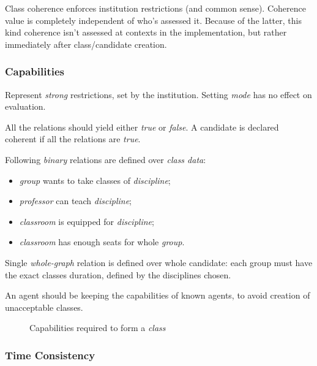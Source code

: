 \documentclass[../header]{subfiles}
\begin{document}
\providecommand{\rootdir}{..}



Class coherence enforces institution restrictions (and common sense).
Coherence value is completely independent of who's assessed it.
Because of the latter, this kind coherence isn't assessed at contexts
in the implementation, but rather immediately after class/candidate creation.

\subsubsection{Capabilities}

Represent \emph{strong} restrictions, set by the institution.
Setting \emph{mode} has no effect on evaluation.

All the relations should yield either \emph{true} or \emph{false}.
A candidate is declared coherent if all the relations are \emph{true}.

Following \emph{binary} relations are defined over \emph{class data}:
\begin{itemize}
  \item \emph{group} wants to take classes of \emph{discipline};
  \item \emph{professor} can teach \emph{discipline};
  \item \emph{classroom} is equipped for \emph{discipline};
  \item \emph{classroom} has enough seats for whole \emph{group}.
\end{itemize}

Single \emph{whole-graph} relation is defined over whole candidate:
each group must have the exact classes duration, defined by the disciplines chosen.

An agent should be keeping the capabilities of known agents, to avoid creation
of unacceptable classes.

\begin{figure}[H]
  \centering
  
  \caption{Capabilities required to form a \emph{class}}
  \label{fig:capabilities}
\end{figure}


\subsubsection{Time Consistency}
\end{document}
